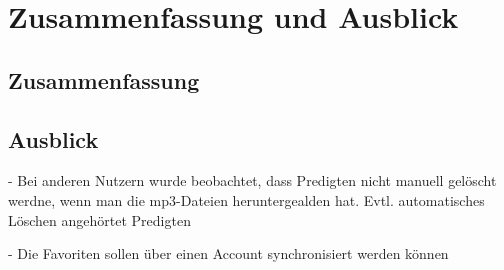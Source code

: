 \chapter{Zusammenfassung und Ausblick}
\label{Kap7}

\section{Zusammenfassung}

\section{Ausblick}
-  Bei anderen Nutzern wurde beobachtet, dass Predigten nicht manuell gelöscht werdne, wenn man die mp3-Dateien heruntergealden hat. Evtl. automatisches Löschen angehörtet Predigten

- Die Favoriten sollen über einen Account synchronisiert werden können	
